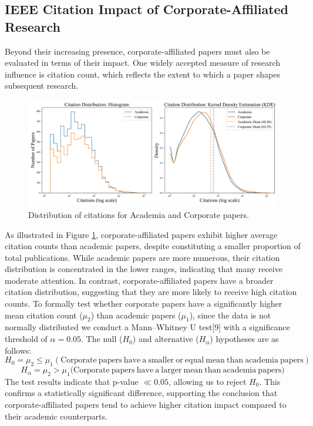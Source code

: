 \documentclass{article}
\begin{document}
\vspace{-5pt}
\vspace{-10pt}
\subsection{IEEE Citation Impact of Corporate-Affiliated Research}
\vspace{-10pt}
Beyond their increasing presence, corporate-affiliated papers must also be evaluated in terms of their impact. One widely accepted measure of research influence is citation count, which reflects the extent to which a paper shapes subsequent research.
\begin{figure}[ht]
    \centering
    \includegraphics[width=0.9\linewidth]{report/images/paper_distribution.png}
    \caption{Distribution of citations for Academia and Corporate papers.}
    \label{fig:ieee_citations}
\end{figure}
As illustrated in Figure \ref{fig:ieee_citations}, corporate-affiliated papers exhibit higher average citation counts than academic papers, despite constituting a smaller proportion of total publications. While academic papers are more numerous, their citation distribution is concentrated in the lower ranges, indicating that many receive moderate attention. In contrast, corporate-affiliated papers have a broader citation distribution, suggesting that they are more likely to receive high citation counts. To formally test whether corporate papers have a significantly higher mean citation count ($\mu_2$) than academic papers ($\mu_1$), since the data is not normally distributed we conduct a Mann–Whitney U test[9] with a significance threshold of $\alpha = 0.05$. The null ($H_0$) and alternative ($H_\alpha$) hypotheses are as follows:
\[
H_0 = \mu_2 \leq \mu_1 (\mathrm{Corporate \ papers\ have \ a \ smaller \ or \ equal \ mean \ than \ academia \ papers})
\]
\[
H_\alpha = \mu_2 > \mu_1 (\mathrm{Corporate \ papers\ have \ a \ larger \ mean\ than \ academia \ papers)}
\]
The test results indicate that p-value $\ll 0.05$, allowing us to reject $H_0$. This confirms a statistically significant difference, supporting the conclusion that corporate-affiliated papers tend to achieve higher citation impact compared to their academic counterparts.  
\vspace{-10pt}
\end{document}
